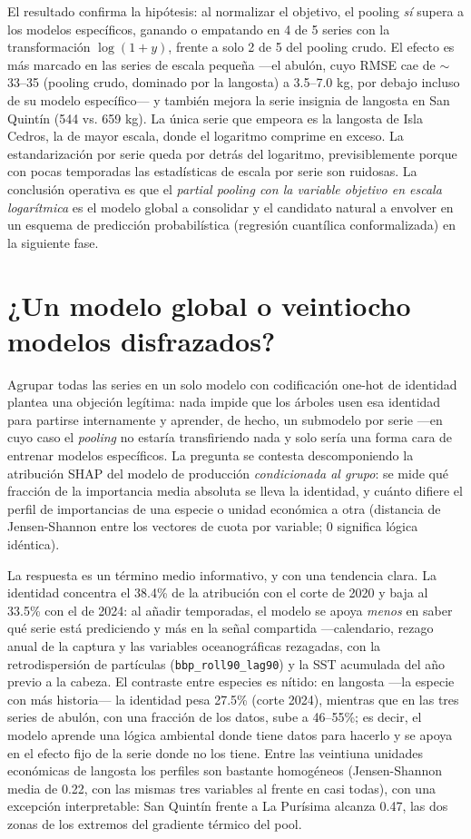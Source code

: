 El resultado confirma la hipótesis: al normalizar el objetivo, el pooling \emph{sí} supera a los modelos específicos, ganando o empatando en 4 de 5 series con la transformación $\log(1+y)$, frente a solo 2 de 5 del pooling crudo. El efecto es más marcado en las series de escala pequeña —el abulón, cuyo RMSE cae de $\sim$33--35 (pooling crudo, dominado por la langosta) a 3.5--7.0 kg, por debajo incluso de su modelo específico— y también mejora la serie insignia de langosta en San Quintín (544 vs. 659 kg). La única serie que empeora es la langosta de Isla Cedros, la de mayor escala, donde el logaritmo comprime en exceso. La estandarización por serie queda por detrás del logaritmo, previsiblemente porque con pocas temporadas las estadísticas de escala por serie son ruidosas. La conclusión operativa es que el \emph{partial pooling con la variable objetivo en escala logarítmica} es el modelo global a consolidar y el candidato natural a envolver en un esquema de predicción probabilística (regresión cuantílica conformalizada) en la siguiente fase.

\section{¿Un modelo global o veintiocho modelos disfrazados?}
\label{sec:res_shap_grupo}
Agrupar todas las series en un solo modelo con codificación one-hot de identidad plantea una objeción legítima: nada impide que los árboles usen esa identidad para partirse internamente y aprender, de hecho, un submodelo por serie ---en cuyo caso el \emph{pooling} no estaría transfiriendo nada y solo sería una forma cara de entrenar modelos específicos. La pregunta se contesta descomponiendo la atribución SHAP del modelo de producción \emph{condicionada al grupo}: se mide qué fracción de la importancia media absoluta se lleva la identidad, y cuánto difiere el perfil de importancias de una especie o unidad económica a otra (distancia de Jensen-Shannon entre los vectores de cuota por variable; 0 significa lógica idéntica).

La respuesta es un término medio informativo, y con una tendencia clara. La identidad concentra el 38.4\% de la atribución con el corte de 2020 y baja al 33.5\% con el de 2024: al añadir temporadas, el modelo se apoya \emph{menos} en saber qué serie está prediciendo y más en la señal compartida ---calendario, rezago anual de la captura y las variables oceanográficas rezagadas, con la retrodispersión de partículas (\texttt{bbp\_roll90\_lag90}) y la SST acumulada del año previo a la cabeza. El contraste entre especies es nítido: en langosta ---la especie con más historia--- la identidad pesa 27.5\% (corte 2024), mientras que en las tres series de abulón, con una fracción de los datos, sube a 46--55\%; es decir, el modelo aprende una lógica ambiental donde tiene datos para hacerlo y se apoya en el efecto fijo de la serie donde no los tiene. Entre las veintiuna unidades económicas de langosta los perfiles son bastante homogéneos (Jensen-Shannon media de 0.22, con las mismas tres variables al frente en casi todas), con una excepción interpretable: San Quintín frente a La Purísima alcanza 0.47, las dos zonas de los extremos del gradiente térmico del pool.

